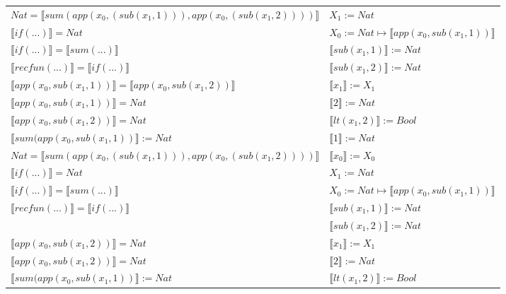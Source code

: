 \begin{exercise}
\begin{description}
\begin{center}
\begin{longtable}[!h]{ | l | l | }
                        $Nat =  \llbracket sum(app(x_0, (sub(x_1,1))), app(x_0, (sub(x_1,2)))) \rrbracket$ & $X_1 := Nat$\\
                        $ \llbracket if(...) \rrbracket = Nat$ & $X_0 := Nat \mapsto  \llbracket app(x_0, sub(x_1,1)) \rrbracket$\\
                        $ \llbracket if(...) \rrbracket =  \llbracket sum(...) \rrbracket$ & $ \llbracket sub(x_1,1) \rrbracket := Nat$\\
                        $ \llbracket recfun(...) \rrbracket =  \llbracket if(...) \rrbracket$ & $ \llbracket sub(x_1,2) \rrbracket := Nat$ \\
                    \hline
			     $ \llbracket app(x_0, sub(x_1,1)) \rrbracket =  \llbracket app(x_0, sub(x_1,2)) \rrbracket$ &   $ \llbracket x_1 \rrbracket := X_1$\\ 
                        $ \llbracket app(x_0, sub(x_1,1)) \rrbracket = Nat$ & $ \llbracket 2 \rrbracket := Nat$\\ 
                        $ \llbracket app(x_0, sub(x_1,2)) \rrbracket = Nat$ & $ \llbracket lt(x_1 , 2) \rrbracket := Bool$\\
                        $ \llbracket sum(app(x_0, sub(x_1,1)) \rrbracket := Nat$ &    $ \llbracket 1 \rrbracket := Nat$\\ 
                        $Nat =  \llbracket sum(app(x_0, (sub(x_1,1))), app(x_0, (sub(x_1,2)))) \rrbracket$ &  $ \llbracket x_0 \rrbracket := X_0$\\
                        $ \llbracket if(...) \rrbracket = Nat$ &  $X_1 := Nat$\\ 
                        $ \llbracket if(...) \rrbracket =  \llbracket sum(...) \rrbracket$ &  $X_0 := Nat \mapsto  \llbracket app(x_0, sub(x_1,1)) \rrbracket$\\ 
                        $ \llbracket recfun(...) \rrbracket =  \llbracket if(...) \rrbracket$ &  $ \llbracket sub(x_1,1) \rrbracket := Nat$\\ 
                        & $ \llbracket sub(x_1,2) \rrbracket := Nat$ \\
                    \hline
                        $ \llbracket app(x_0, sub(x_1,2)) \rrbracket = Nat$ &  $ \llbracket x_1 \rrbracket := X_1$\\
                        $ \llbracket app(x_0, sub(x_1,2)) \rrbracket = Nat$ &   $ \llbracket 2 \rrbracket := Nat$\\  
                        $ \llbracket sum(app(x_0, sub(x_1,1)) \rrbracket := Nat$ & $ \llbracket lt(x_1 , 2) \rrbracket := Bool$\\ 

\end{longtable}
\end{center}
\end{description}
\end{exercise}
